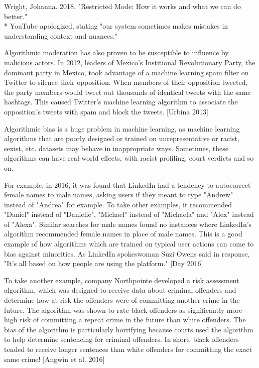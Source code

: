 \documentclass[class=book, crop=false]{standalone}
\begin{document}
Wright, Johanna. 2018. "Restricted Mode: How it works and what we can do better."\\
 * YouTube apologized, stating "our system sometimes makes mistakes in understanding context and nuances."

Algorithmic moderation has also proven to be susceptible to influence by malicious actors. In 2012, leaders of Mexico's Institional Revolutionary Party, the dominant party in Mexico, took advantage of a machine learning spam filter on Twitter to silence their opposition. When members of their opposition tweeted, the party members would tweet out thousands of identical tweets with the same hashtags. This caused Twitter's machine learning algorithm to associate the opposition's tweets with spam and block the tweets. [Urbina 2013]

Algorithmic bias is a huge problem in machine learning, as machine learning algorithms that are poorly designed or trained on unrepresentative or racist, sexist, etc. datasets may behave in inappropriate ways. Sometimes, these algorithms can have real-world effects, with racist profiling, court verdicts and so on.

For example, in 2016, it was found that LinkedIn had a tendency to autocorrect female names to male names, asking users if they meant to type "Andrew" instead of "Andrea" for example. To take other examples, it recommended "Daniel" instead of "Danielle", "Michael" instead of "Michaela" and "Alex" instead of "Alexa". Similar searches for male names found no instances where LinkedIn's algorithm recommended female names in place of male names. This is a good example of how algorithms which are trained on typical user actions can come to bias against minorities. As LinkedIn spokeswoman Suzi Owens said in response, "It's all based on how people are using the platform." [Day 2016]

To take another example, company Northpointe developed a risk assessment algorithm, which was designed to receive data about criminal offenders and determine how at risk the offenders were of committing another crime in the future. The algorithm was shown to rate black offenders as significantly more high risk of committing a repeat crime in the future than white offenders. The bias of the algorithm is particularly horrifying because courts used the algorithm to help determine sentencing for criminal offenders. In short, black offenders tended to receive longer sentences than white offenders for committing the exact same crime! [Angwin et al. 2016]
\end{document}
